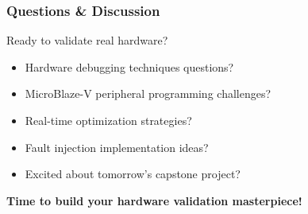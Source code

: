 \documentclass{beamer}
\begin{document}
\begin{frame}
\frametitle{Questions \& Discussion}
\begin{center}
\Large Ready to validate real hardware?
\end{center}

\begin{itemize}
    \item Hardware debugging techniques questions?
    \item MicroBlaze-V peripheral programming challenges?
    \item Real-time optimization strategies?
    \item Fault injection implementation ideas?
    \item Excited about tomorrow's capstone project?
\end{itemize}

\vspace{1cm}
\begin{center}
\textbf{Time to build your hardware validation masterpiece!}
\end{center}
\end{frame}
\end{document}

